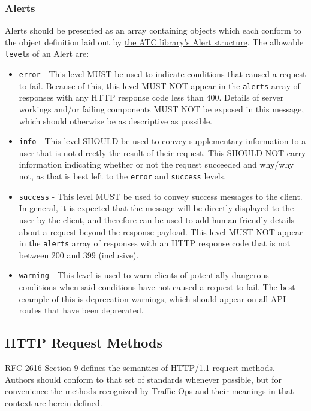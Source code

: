 \documentclass{article}
\newcommand{\code}[1]{\texttt{\color{inlinecodecolor}#1}}
\begin{document}
\subsubsection{Alerts}
Alerts should be presented as an array containing objects which each conform to the object definition laid out by
\href{https://godoc.org/github.com/apache/trafficcontrol/lib/go-tc#Alert}{the ATC library's Alert structure}. The allowable \code{level}s of an Alert are:

\begin{itemize}
	\item \code{error} - This level MUST be used to indicate conditions that caused a request to fail. Because of this, this level MUST NOT appear
	in the \code{alerts} array of responses with any HTTP response code less than 400. Details of server workings and/or failing
	components MUST NOT be exposed in this message, which should otherwise be as descriptive as possible.
	\item \code{info} - This level SHOULD be used to convey supplementary information to a user that is not directly the result of their request.
	This SHOULD NOT carry information indicating whether or not the request succeeded and why/why not, as that is best left to the \code{error}
	and \code{success} levels.
	\item \code{success} - This level MUST be used to convey success messages to the client. In general, it is expected that the message will be
	directly displayed to the user by the client, and therefore can be used to add human-friendly details about a request beyond the response
	payload. This level MUST NOT appear in the \code{alerts} array of responses with an HTTP response code that is not between 200 and 399
	(inclusive).
	\item \code{warning} - This level is used to warn clients of potentially dangerous conditions when said conditions have not caused a request
	to fail. The best example of this is deprecation warnings, which should appear on all API routes that have been deprecated.
\end{itemize}


\subsection{HTTP Request Methods}
\href{https://tools.ietf.org/html/rfc2616#section-9}{RFC 2616 Section 9} defines the semantics of HTTP/1.1 request methods. Authors should conform
to that set of standards whenever possible, but for convenience the methods recognized by Traffic Ops and their meanings in that context are
herein defined.
\end{document}

